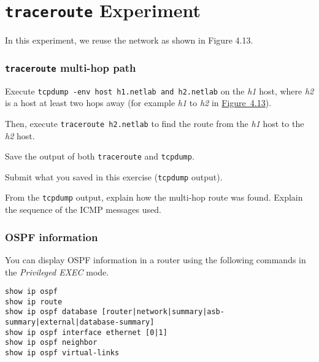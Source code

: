 \documentclass{../UTNetLab}
\begin{document}
\part{\texttt{traceroute} Experiment}
In this experiment, we reuse the network as shown in Figure 4.13.

\section{\texttt{traceroute} multi-hop path}\label{sec:traceroute}
    Execute \lstinline[emph={h1,h2,netlab},morekeywords={[3]host,and}]{tcpdump -env host h1.netlab and h2.netlab} on the \textit{h1} host, where \textit{h2} is a host at least two hops away (for example \textit{h1} to \textit{h2} in \hyperref[fig:4.13]{Figure~4.13}).

    Then, execute \lstinline[emph={h2,netlab}]{traceroute h2.netlab} to find the route from the \textit{h1} host to the \textit{h2} host.

    Save the output of both \lstinline{traceroute} and \lstinline{tcpdump}.

    \begin{report}
        \item Submit what you saved in this exercise (\lstinline{tcpdump} output).

        \item From the \lstinline{tcpdump} output, explain how the multi-hop route was found.
    Explain the sequence of the ICMP messages used.
    \end{report}

\newpage
\appendix

\section{OSPF information}
    You can display OSPF information in a router using the following commands in the \textit{Privileged EXEC} mode.
    \begin{lstlisting}[language={cisco}]
show ip ospf
show ip route
show ip ospf database [router|network|summary|asb-summary|external|database-summary]
show ip ospf interface ethernet [0|1]
show ip ospf neighbor
show ip ospf virtual-links
    \end{lstlisting}
\end{document}
